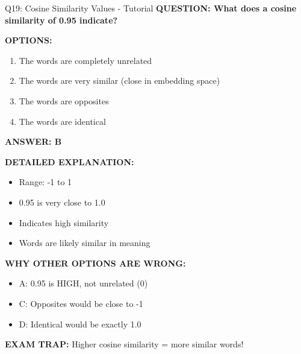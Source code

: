 \documentclass[8pt]{beamer}
\begin{document}
	\begin{frame}{Q19: Cosine Similarity Values - Tutorial}
		\fontsize{6.5}{7.5}\selectfont
		\textbf{QUESTION: What does a cosine similarity of 0.95 indicate?}
		
		\vspace{0.1cm}
		\textbf{OPTIONS:}
		\begin{enumerate}
			\item The words are completely unrelated
			\item The words are very similar (close in embedding space)
			\item The words are opposites
			\item The words are identical
		\end{enumerate}
		
		\vspace{0.1cm}
		\textcolor{myblue}{\textbf{ANSWER: B}}
		
		\vspace{0.1cm}
		\textbf{DETAILED EXPLANATION:}
		\begin{itemize}
			\item Range: -1 to 1
			\item 0.95 is very close to 1.0
			\item Indicates high similarity
			\item Words are likely similar in meaning
		\end{itemize}
		
		\vspace{0.1cm}
		\textcolor{myred}{\textbf{WHY OTHER OPTIONS ARE WRONG:}}
		\begin{itemize}
			\item \textcolor{myred}{A:} 0.95 is HIGH, not unrelated (0)
			\item \textcolor{myred}{C:} Opposites would be close to -1
			\item \textcolor{myred}{D:} Identical would be exactly 1.0
		\end{itemize}
		
		\textcolor{myred}{\textbf{EXAM TRAP:}} Higher cosine similarity = \textcolor{myblue}{more similar words}!
	\end{frame}
	
\end{document}

